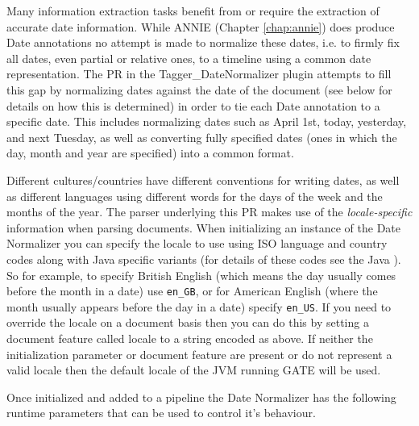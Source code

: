 
Many information extraction tasks benefit from or require the extraction of
accurate date information. While ANNIE (Chapter \ref{chap:annie}) does produce
Date annotations no attempt is made to normalize these dates, i.e. to firmly
fix all dates, even partial or relative ones, to a timeline using a common
date representation. The PR in the Tagger\_DateNormalizer plugin attempts
to fill this gap by normalizing dates against the date of the document (see
below for details on how this is determined) in order to tie each Date
annotation to a specific date. This includes normalizing dates such as
April 1st, today, yesterday, and next Tuesday, as well as converting
fully specified dates (ones in which the day, month and year are
specified) into a common format.

Different cultures/countries have different conventions for writing dates, as
well as different languages using different words for the days of the week and
the months of the year. The parser underlying this PR makes use of the
\textit{locale-specific} information when parsing documents. When initializing
an instance of the Date Normalizer you can specify the locale to use using
ISO language and country codes along with Java specific variants (for details
of these codes see the Java
).
So for example, to specify British English (which means the day usually comes
before the month in a date) use \texttt{en\_GB}, or for American English (where
the month usually appears before the day in a date) specify \texttt{en\_US}.
If you need to override the locale on a document basis then you can do this by
setting a document feature called locale to a string encoded as above. If neither
the initialization parameter or document feature are present or do not represent
a valid locale then the default locale of the JVM running GATE will be used.

Once initialized and added to a pipeline the Date Normalizer has the following
runtime parameters that can be used to control it's behaviour.

